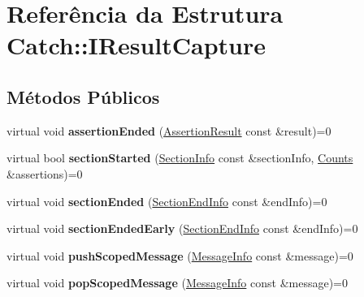 \hypertarget{structCatch_1_1IResultCapture}{}\section{Referência da Estrutura Catch\+:\+:I\+Result\+Capture}
\label{structCatch_1_1IResultCapture}
\subsection*{Métodos Públicos}
\begin{DoxyCompactItemize}
\item 
virtual void {\bfseries assertion\+Ended} (\hyperlink{classCatch_1_1AssertionResult}{Assertion\+Result} const \&result)=0\hypertarget{structCatch_1_1IResultCapture_ae45e08bccc5fb434656d4f2e44742223}{}\label{structCatch_1_1IResultCapture_ae45e08bccc5fb434656d4f2e44742223}

\item 
virtual bool {\bfseries section\+Started} (\hyperlink{structCatch_1_1SectionInfo}{Section\+Info} const \&section\+Info, \hyperlink{structCatch_1_1Counts}{Counts} \&assertions)=0\hypertarget{structCatch_1_1IResultCapture_a5b76ed52badcb64cf374202e12b81a03}{}\label{structCatch_1_1IResultCapture_a5b76ed52badcb64cf374202e12b81a03}

\item 
virtual void {\bfseries section\+Ended} (\hyperlink{structCatch_1_1SectionEndInfo}{Section\+End\+Info} const \&end\+Info)=0\hypertarget{structCatch_1_1IResultCapture_a4e152bc43dc0933684e31fa67a58195d}{}\label{structCatch_1_1IResultCapture_a4e152bc43dc0933684e31fa67a58195d}

\item 
virtual void {\bfseries section\+Ended\+Early} (\hyperlink{structCatch_1_1SectionEndInfo}{Section\+End\+Info} const \&end\+Info)=0\hypertarget{structCatch_1_1IResultCapture_afcc71eef8ca821ae132cced4a2be6988}{}\label{structCatch_1_1IResultCapture_afcc71eef8ca821ae132cced4a2be6988}

\item 
virtual void {\bfseries push\+Scoped\+Message} (\hyperlink{structCatch_1_1MessageInfo}{Message\+Info} const \&message)=0\hypertarget{structCatch_1_1IResultCapture_a91d154c1e087e383dcde5aad95cb6a05}{}\label{structCatch_1_1IResultCapture_a91d154c1e087e383dcde5aad95cb6a05}

\item 
virtual void {\bfseries pop\+Scoped\+Message} (\hyperlink{structCatch_1_1MessageInfo}{Message\+Info} const \&message)=0\hypertarget{structCatch_1_1IResultCapture_a42bcb13276706bf8c3ce081ce16d37fd}{}\label{structCatch_1_1IResultCapture_a42bcb13276706bf8c3ce081ce16d37fd}


\end{DoxyCompactItemize}
